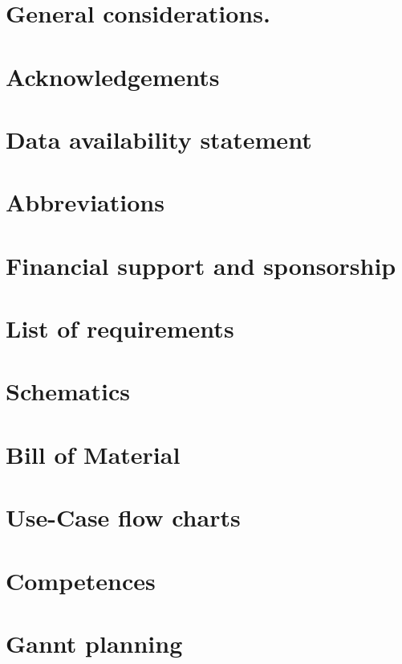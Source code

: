 \documentclass{article}
\begin{document}
		
		\newpage
		\section{General considerations.}
		
		\section{Acknowledgements}
		
		\section{Data availability statement}
		
		\section{Abbreviations}
		
		\section{	Financial support and sponsorship}
		
		
		\appendix
		
		
		\section{ List of requirements }
		
		\section{ Schematics }
		
		\section{ Bill of Material }
		
		\section{ Use-Case flow charts}
		
		\section{Competences}
		
		\section{ Gannt planning }
		
\end{document}
